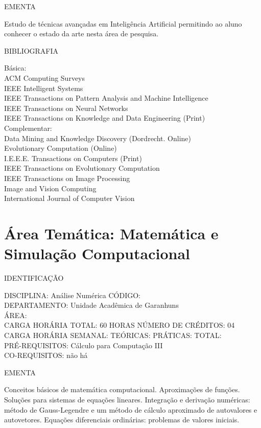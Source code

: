\documentclass[
	12pt,				%
	openright,			%
  oneside,     %
	a4paper,			%
	chapter=TITLE,		%
	english,			%
	french,				%
	spanish,			%
	brazil				%
	]{abntex2}
\begin{document}
\begin{apendicesenv}
EMENTA 

Estudo de técnicas avançadas em Inteligência Artificial permitindo ao
aluno conhecer o estado da arte nesta área de pesquisa.

BIBLIOGRAFIA 

Básica:\\
ACM Computing Surveys\\
IEEE Intelligent Systems\\
IEEE Transactions on Pattern Analysis and Machine Intelligence\\
IEEE Transactions on Neural Networks\\
IEEE Transactions on Knowledge and Data Engineering (Print)\\
Complementar:\\
Data Mining and Knowledge Discovery (Dordrecht. Online)\\
Evolutionary Computation (Online)\\
I.E.E.E. Transactions on Computers (Print)\\
IEEE Transactions on Evolutionary Computation\\
IEEE Transactions on Image Processing\\
Image and Vision Computing\\
International Journal of Computer Vision
\newpage

\section*{Área Temática: Matemática e Simulação Computacional}

IDENTIFICAÇÃO

DISCIPLINA: Análise Numérica CÓDIGO:\\ 
DEPARTAMENTO: Unidade Acadêmica de Garanhuns\\
ÁREA: \\
CARGA HORÁRIA TOTAL: 60 HORAS NÚMERO DE CRÉDITOS: 04\\
CARGA HORÁRIA SEMANAL: TEÓRICAS: PRÁTICAS: TOTAL: \\
PRÉ-REQUISITOS: Cálculo para Computação III\\
CO-REQUISITOS: não há

EMENTA 

Conceitos básicos de matemática computacional. Aproximações de funções.
Soluções para sistemas de equações lineares. Integração e derivação
numéricas: método de Gauss-Legendre e um método de cálculo aproximado
de autovalores e autovetores. Equações diferenciais ordinárias:
problemas de valores iniciais.


\end{apendicesenv}
\end{document}
